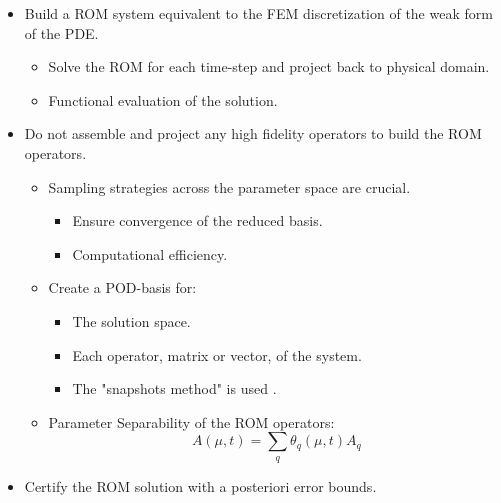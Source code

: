 \documentclass[../main.tex]{subfiles}
\begin{document}

\begin{itemize}
    \item Build a ROM system equivalent to the FEM discretization of the weak form of the PDE.
    \begin{itemize}
        \item Solve the ROM for each time-step and project back to physical domain.
        \item Functional evaluation of the solution.
    \end{itemize}
    \item Do not assemble and project any high fidelity operators to build the ROM operators.
    \begin{itemize}
        \item Sampling strategies across the parameter space are crucial.
            \begin{itemize}
                \item Ensure convergence of the reduced basis.
                \item Computational efficiency.
            \end{itemize}
        \item Create a POD-basis for:
        \begin{itemize}
            \item The solution space.
            \item Each operator, matrix or vector, of the system.
            \item The "snapshots method" is used \cite{1987_turbulenceDynamicsCoherentStructures_Sirovich, 2003_podBasedReducedOrderModelsWithDeformingGrids_anttonen}.
        \end{itemize}
        \item Parameter Separability of the ROM operators:
        \begin{equation*}
            A(\mu, t) = \sum_q \theta_q(\mu, t) A_q
        \end{equation*}
    \end{itemize}
    \item Certify the ROM solution with a posteriori error bounds.
\end{itemize}
\end{document}
